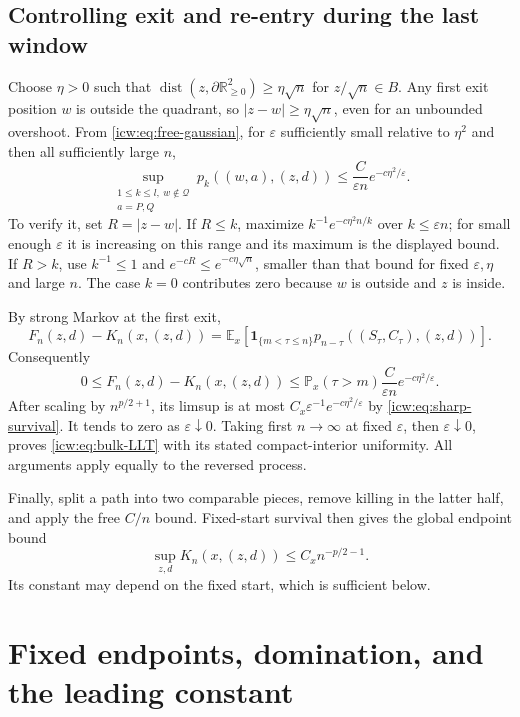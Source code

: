 \documentclass[11pt,letterpaper]{article}
\theoremstyle{remark}\newtheorem{remark}[theorem]{Remark}
\newcommand{\RR}{\mathbb R}
\newcommand{\eps}{\varepsilon}
\newcommand{\Prob}{\mathbb P}
\newcommand{\E}{\mathbb E}
\newcommand{\Qd}{\mathcal Q}
\newcommand{\1}{\mathbf1}
\DeclareMathOperator{\dist}{dist}
\begin{document}
\subsection{Controlling exit and re-entry during the last window}
Choose $\eta>0$ such that
$\dist(z,\partial\RR_{\ge0}^2)\ge\eta\sqrt n$ for $z/\sqrt n\in B$.
Any first exit position $w$ is outside the quadrant, so
$|z-w|\ge\eta\sqrt n$, even for an unbounded overshoot. From
\eqref{icw:eq:free-gaussian}, for $\eps$ sufficiently small relative to
$\eta^2$ and then all sufficiently large $n$,
\begin{equation}\label{icw:eq:reentry}
 \sup_{\substack{1\le k\le l,\ w\notin\Qd\\a=P,Q}}
 p_k((w,a),(z,d))\le\frac C{\eps n}e^{-c\eta^2/\eps}.
\end{equation}
To verify it, set $R=|z-w|$. If $R\le k$, maximize
$k^{-1}e^{-c\eta^2n/k}$ over $k\le\eps n$; for small enough
$\eps$ it is increasing on this range and its maximum is the displayed
bound. If $R>k$, use $k^{-1}\le1$ and
$e^{-cR}\le e^{-c\eta\sqrt n}$, smaller than that bound for fixed
$\eps,\eta$ and large $n$. The case $k=0$ contributes zero because
$w$ is outside and $z$ is inside.

By strong Markov at the first exit,
\[
 F_n(z,d)-K_n(x,(z,d))
 =\E_x[\1_{\{m<\tau\le n\}}
             p_{n-\tau}((S_\tau,C_\tau),(z,d))].
\]
Consequently
\begin{equation}\label{icw:eq:smoothing-error}
 0\le F_n(z,d)-K_n(x,(z,d))
 \le\Prob_x(\tau>m)\frac C{\eps n}e^{-c\eta^2/\eps}.
\end{equation}
After scaling by $n^{p/2+1}$, its limsup is at most
$C_x\eps^{-1}e^{-c\eta^2/\eps}$ by \eqref{icw:eq:sharp-survival}.
It tends to zero as $\eps\downarrow0$. Taking first $n\to\infty$
at fixed $\eps$, then $\eps\downarrow0$, proves
\eqref{icw:eq:bulk-LLT} with its stated compact-interior uniformity.
All arguments apply equally to the reversed process.

Finally, split a path into two comparable pieces, remove killing in
the latter half, and apply the free $C/n$ bound. Fixed-start survival
then gives the global endpoint bound
\begin{equation}\label{icw:eq:bulk-sup}
 \sup_{z,d}K_n(x,(z,d))\le C_x n^{-p/2-1}.
\end{equation}
Its constant may depend on the fixed start, which is sufficient below.

\section{Fixed endpoints, domination, and the leading constant}\label{icw:sec:endpoints}
\end{document}
